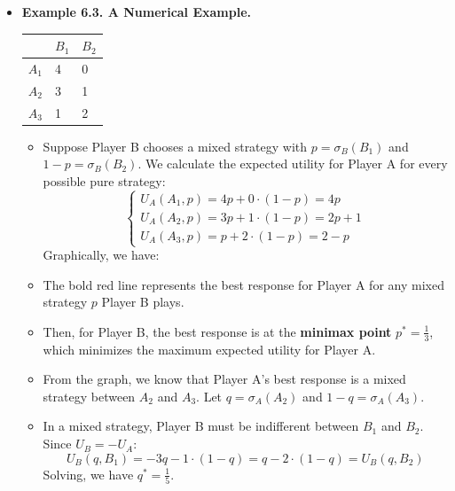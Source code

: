 \documentclass[notitlepage]{article}
\begin{document}
\begin{itemize}
    \newpage
    \item \textbf{Example 6.3. A Numerical Example.}
\begin{table}[h]
\begin{center}
\begin{tabular}{|l|l|l|}
\hline
      & $B_1$ & $B_2$ \\ \hline
$A_1$ & 4     & 0     \\ \hline
$A_2$ & 3     & 1     \\ \hline
$A_3$ & 1     & 2     \\ \hline
\end{tabular}
\end{center}
\end{table}

    \begin{itemize}
    \item Suppose Player B chooses a mixed strategy with \(p = \sigma_B(B_1)\) and \(1-p = \sigma_B(B_2)\). We calculate the expected utility for Player A for every possible pure strategy:
    \[
    \begin{cases}
        U_A(A_1,p) = 4p + 0 \cdot (1-p) = 4p \\
        U_A(A_2,p) = 3p + 1 \cdot (1-p) = 2p + 1 \\
        U_A(A_3,p) = p + 2 \cdot (1-p) = 2 - p
    \end{cases}
    \]
    Graphically, we have:
        \begin{figure}[h]
        \centering
        \resizebox{0.4\textwidth}{!}{
        
        }
        \end{figure}

        \item The bold red line represents the best response for Player A for any mixed strategy \(p\) Player B plays.
        \item Then, for Player B, the best response is at the \textbf{minimax point} \(p^*=\frac{1}{3}\), which minimizes the maximum expected utility for Player A.
        \item From the graph, we know that Player A's best response is a mixed strategy between \(A_2\) and \(A_3\). Let \(q = \sigma_A(A_2)\) and \(1-q = \sigma_A(A_3)\).
        \item In a mixed strategy, Player B must be indifferent between \(B_1\) and \(B_2\). Since \(U_B = -U_A\):
        \[
        U_B(q,B_1) = -3q - 1\cdot(1-q) = q - 2\cdot(1-q) = U_B(q,B_2)
        \]
        Solving, we have \(q^* = \frac{1}{5}\).
    \end{itemize}
\end{itemize}
\end{document}
